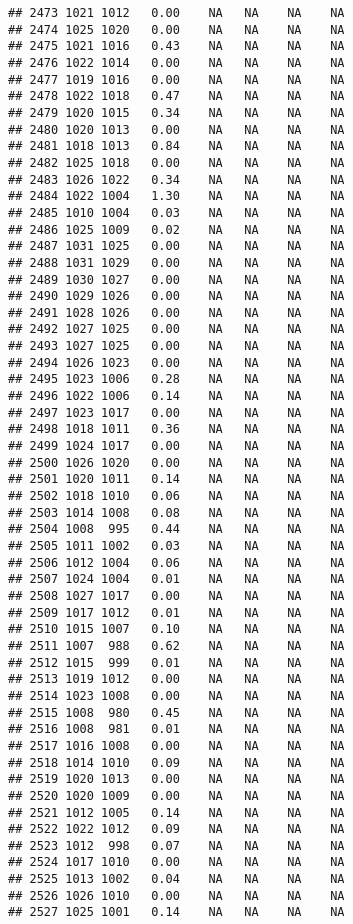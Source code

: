 \documentclass{article}\usepackage{graphicx, color}
\makeatletter
\newenvironment{kframe}{%
 \def\at@end@of@kframe{}%
 \ifinner\ifhmode%
  \def\at@end@of@kframe{\end{minipage}}%
  \begin{minipage}{\columnwidth}%
 \fi\fi%
 \def\FrameCommand##1{\hskip\@totalleftmargin \hskip-\fboxsep
 \colorbox{shadecolor}{##1}\hskip-\fboxsep
     \hskip-\linewidth \hskip-\@totalleftmargin \hskip\columnwidth}%
 \MakeFramed {\advance\hsize-\width
   \@totalleftmargin\z@ \linewidth\hsize
   \@setminipage}}%
 {\par\unskip\endMakeFramed%
 \at@end@of@kframe}
\newenvironment{knitrout}{}{} %
\makeatother
\begin{document}
\begin{knitrout}
\begin{kframe}
\begin{verbatim}
## 2473 1021 1012   0.00    NA   NA    NA    NA
## 2474 1025 1020   0.00    NA   NA    NA    NA
## 2475 1021 1016   0.43    NA   NA    NA    NA
## 2476 1022 1014   0.00    NA   NA    NA    NA
## 2477 1019 1016   0.00    NA   NA    NA    NA
## 2478 1022 1018   0.47    NA   NA    NA    NA
## 2479 1020 1015   0.34    NA   NA    NA    NA
## 2480 1020 1013   0.00    NA   NA    NA    NA
## 2481 1018 1013   0.84    NA   NA    NA    NA
## 2482 1025 1018   0.00    NA   NA    NA    NA
## 2483 1026 1022   0.34    NA   NA    NA    NA
## 2484 1022 1004   1.30    NA   NA    NA    NA
## 2485 1010 1004   0.03    NA   NA    NA    NA
## 2486 1025 1009   0.02    NA   NA    NA    NA
## 2487 1031 1025   0.00    NA   NA    NA    NA
## 2488 1031 1029   0.00    NA   NA    NA    NA
## 2489 1030 1027   0.00    NA   NA    NA    NA
## 2490 1029 1026   0.00    NA   NA    NA    NA
## 2491 1028 1026   0.00    NA   NA    NA    NA
## 2492 1027 1025   0.00    NA   NA    NA    NA
## 2493 1027 1025   0.00    NA   NA    NA    NA
## 2494 1026 1023   0.00    NA   NA    NA    NA
## 2495 1023 1006   0.28    NA   NA    NA    NA
## 2496 1022 1006   0.14    NA   NA    NA    NA
## 2497 1023 1017   0.00    NA   NA    NA    NA
## 2498 1018 1011   0.36    NA   NA    NA    NA
## 2499 1024 1017   0.00    NA   NA    NA    NA
## 2500 1026 1020   0.00    NA   NA    NA    NA
## 2501 1020 1011   0.14    NA   NA    NA    NA
## 2502 1018 1010   0.06    NA   NA    NA    NA
## 2503 1014 1008   0.08    NA   NA    NA    NA
## 2504 1008  995   0.44    NA   NA    NA    NA
## 2505 1011 1002   0.03    NA   NA    NA    NA
## 2506 1012 1004   0.06    NA   NA    NA    NA
## 2507 1024 1004   0.01    NA   NA    NA    NA
## 2508 1027 1017   0.00    NA   NA    NA    NA
## 2509 1017 1012   0.01    NA   NA    NA    NA
## 2510 1015 1007   0.10    NA   NA    NA    NA
## 2511 1007  988   0.62    NA   NA    NA    NA
## 2512 1015  999   0.01    NA   NA    NA    NA
## 2513 1019 1012   0.00    NA   NA    NA    NA
## 2514 1023 1008   0.00    NA   NA    NA    NA
## 2515 1008  980   0.45    NA   NA    NA    NA
## 2516 1008  981   0.01    NA   NA    NA    NA
## 2517 1016 1008   0.00    NA   NA    NA    NA
## 2518 1014 1010   0.09    NA   NA    NA    NA
## 2519 1020 1013   0.00    NA   NA    NA    NA
## 2520 1020 1009   0.00    NA   NA    NA    NA
## 2521 1012 1005   0.14    NA   NA    NA    NA
## 2522 1022 1012   0.09    NA   NA    NA    NA
## 2523 1012  998   0.07    NA   NA    NA    NA
## 2524 1017 1010   0.00    NA   NA    NA    NA
## 2525 1013 1002   0.04    NA   NA    NA    NA
## 2526 1026 1010   0.00    NA   NA    NA    NA
## 2527 1025 1001   0.14    NA   NA    NA    NA

\end{verbatim}
\end{kframe}
\end{knitrout}
\end{document}
